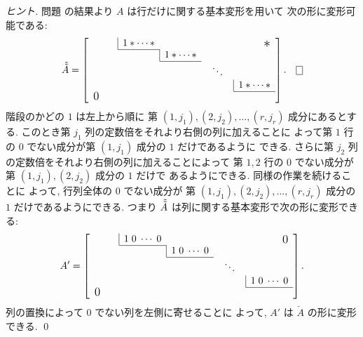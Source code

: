 \documentclass[12pt,twoside]{jarticle}
\begin{document}
\begin{proof}[ヒント]
  問題  の結果より $A$ は行だけに関する基本変形を用いて
  次の形に変形可能である:
  \begin{equation*}
    \Tilde{\Tilde{A}} = 
    \left[
      \begin{array}{ccccr}
        \multicolumn{1}{c|}{\qquad} & 1 *\cdots* & & & \bigstaru \\
        \cline{2-2}
        \multicolumn{2}{c|}{} & 1 *\cdots* & & \\
        \cline{3-3}
        \multicolumn{3}{c}{} & \;\;\ddots\;\; & \\
        \multicolumn{4}{c|}{} & 1 *\cdots* \\
        \cline{5-5}
        \multicolumn{5}{l}{\bigzerol} \\
      \end{array}
    \right]. 
    \qed
  \end{equation*}
  階段のかどの $1$ は左上から順に
  第 $(1,j_1),(2,j_2),\ldots,(r,j_r)$ 成分にあるとする.
  このとき第 $j_1$ 列の定数倍をそれより右側の列に加えることに
  よって第 $1$ 行の $0$ でない成分が第 $(1,j_1)$ 成分の $1$ だけであるように
  できる. さらに第 $j_2$ 列の定数倍をそれより右側の列に加えることによって
  第 $1,2$ 行の $0$ でない成分が第 $(1,j_1),(2,j_2)$ 成分の $1$ だけで
  あるようにできる. 同様の作業を続けることに
  よって, 行列全体の $0$ でない成分が
  第 $(1,j_1),(2,j_2),\ldots,(r,j_r)$ 成分の $1$ だけであるようにできる.
  つまり $\Tilde{\Tilde{A}}$ は列に関する基本変形で次の形に変形できる:
  \begin{equation*}
    A' = 
    \left[
      \begin{array}{ccccr}
        \multicolumn{1}{c|}{\qquad} & 1 \; 0\;\cdots\;0 & & & \bigzerou \\
        \cline{2-2}
        \multicolumn{2}{c|}{} & 1 \; 0\;\cdots\;0 & & \\
        \cline{3-3}
        \multicolumn{3}{c}{} & \;\;\ddots\;\; & \\
        \multicolumn{4}{c|}{} & 1 \; 0\;\cdots\;0 \\
        \cline{5-5}
        \multicolumn{5}{l}{\bigzerol} \\
      \end{array}
    \right]. 
  \end{equation*}
  列の置換によって $0$ でない列を左側に寄せることに
  よって, $A'$ は $\check{A}$ の形に変形できる.
  \qed
\end{proof}

\end{document}

